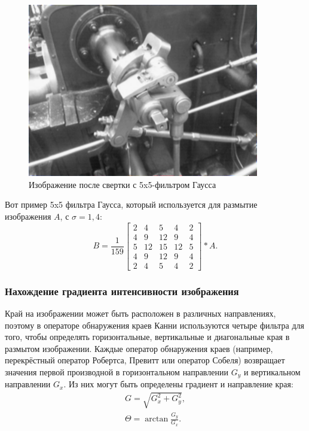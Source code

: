 \begin{figure}
  \centering
  \includegraphics[width=0.9\textwidth]{images/canny-gaussian.png}
  \caption{Изображение после свертки с 5x5-фильтром Гаусса\label{canny-gaussian}}
\end{figure}

Вот пример 5x5 фильтра Гаусса, который используется для размытие изображения $A$, с $\sigma = 1,4$:
\begin{displaymath}
  B = \frac{1}{159}
  \begin{bmatrix}
    2 &  4 &  5 &  4 & 2 \\
    4 &  9 & 12 &  9 & 4 \\
    5 & 12 & 15 & 12 & 5 \\
    4 &  9 & 12 &  9 & 4 \\
    2 &  4 &  5 &  4 & 2
  \end{bmatrix} * A.
\end{displaymath}

\subsubsection{Нахождение градиента интенсивности изображения}
Край на изображении может быть расположен в различных направлениях, поэтому в операторе обнаружения краев Канни используются четыре фильтра для того, чтобы определять горизонтальные, вертикальные и диагональные края в размытом изображении. Каждые оператор обнаружения краев (например, перекрёстный оператор Робертса, Превитт или оператор Собеля) возвращает значения первой производной в горизонтальном направлении $G_y$ и вертикальном направлении $G_x$. Из них могут быть определены градиент и направление края:
\begin{gather*}
  G = \sqrt{G_x^2 + G_y^2},\\
  \Theta = \arctan{\frac{G_y}{G_x}}.
\end{gather*}

